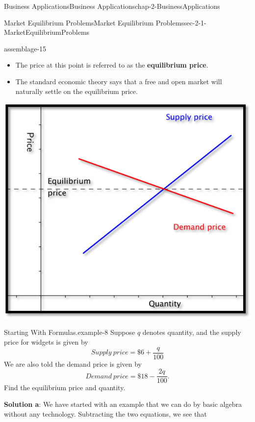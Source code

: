 \documentclass[oneside,10pt,]{book}
\newcommand{\terminology}[1]{\textbf{#1}}
\numberwithin{equation}{section}
\begin{document}
\begin{chapterptx}{Business Applications}{}{Business Applications}{}{}{chap-2-BusinessApplications}
\begin{sectionptx}{Market Equilibrium Problems}{}{Market Equilibrium Problems}{}{}{sec-2-1-MarketEquilibriumProblems}
\begin{assemblage}{}{assemblage-15}
\begin{itemize}[label=\textbullet]
\item{}\hypertarget{p-560}{}%
The price at this point is referred to as the \terminology{equilibrium price}\textasciigrave{}.%
\item{}\hypertarget{p-561}{}%
The standard economic theory says that a free and open market will naturally settle on the equilibrium price.%
\end{itemize}
%
\end{assemblage}
\begin{sidebyside}{1}{0.2}{0.2}{0}%
\begin{sbspanel}{0.6}%
\includegraphics[width=1\linewidth]{images/sec2-1-1.png}
\end{sbspanel}%
\end{sidebyside}%
\begin{example}{Starting With Formulas.}{example-8}%
\hypertarget{p-562}{}%
Suppose \(q\) denotes quantity, and the supply price for widgets is given by%
%
\begin{equation*}
Supply \ price=\$6+\frac{q}{100}
\end{equation*}
\hypertarget{p-563}{}%
We are also told the demand price is given by%
%
\begin{equation*}
Demand \ price=\$18-\frac{2q}{100}.
\end{equation*}
\hypertarget{p-564}{}%
Find the equilibrium price and quantity.%
\par
\hypertarget{p-565}{}%
\terminology{Solution a}: We have started with an example that we can do by basic algebra without any technology.  Subtracting the two equations, we see that%

\end{example}
\end{sectionptx}
\end{chapterptx}
\end{document}
